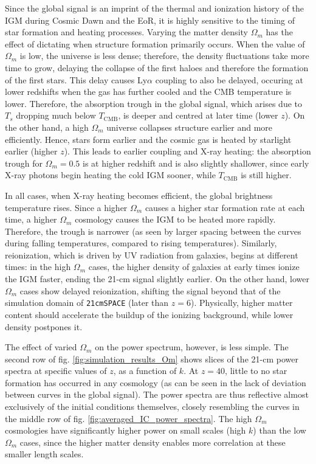 \documentclass[floats,floatfix,showpacs,amssymb,prd,superscriptaddress,nofootinbib]{revtex4-2} %
\newcommand{\code}{\texttt}
\begin{document}
Since the global signal is an imprint of the thermal and ionization history of the IGM during Cosmic Dawn and the EoR, it is highly sensitive to the timing of star formation and heating processes. Varying the matter density $\Omega_m$ has the effect of dictating when structure formation primarily occurs. When the value of $\Omega_m$ is low, the universe is less dense; therefore, the density fluctuations take more time to grow, delaying the collapse of the first haloes and therefore the formation of the first stars. This delay causes Ly$\alpha$ coupling to also be delayed, occuring at lower redshifts when the gas has further cooled and the CMB temperature is lower. Therefore, the absorption trough in the global signal, which arises due to $T_s$ dropping much below $T_\text{CMB}$, is deeper and centred at later time (lower $z$). On the other hand, a high $\Omega_m$ universe collapses structure earlier and more efficiently. Hence, stars form earlier and the cosmic gas is heated by starlight earlier (higher $z$). This leads to earlier coupling and X-ray heating: the absorption trough for $\Omega_m = 0.5$ is at higher redshift and is also slightly shallower, since early X-ray photons begin heating the cold IGM sooner, while $T_\text{CMB}$ is still higher. 

In all cases, when X-ray heating becomes efficient, the global brightness temperature rises. Since a higher $\Omega_m$ causes a higher star formation rate at each time, a higher $\Omega_m$ cosmology causes the IGM to be heated more rapidly. Therefore, the trough is narrower (as seen by larger spacing between the curves during falling temperatures, compared to rising temperatures). Similarly, reionization, which is driven by UV radiation from galaxies, begins at different times: in the high $\Omega_m$ cases, the higher density of galaxies at early times ionize the IGM faster, ending the 21-cm signal slightly earlier. On the other hand, lower $\Omega_m$ cases show delayed reionization, shifting the signal beyond that of the simulation domain of \code{21cmSPACE} (later than $z = 6$). Physically, higher matter content should accelerate the buildup of the ionizing background, while lower density postpones it.

The effect of varied $\Omega_m$ on the power spectrum, however, is less simple. The second row of fig. \ref{fig:simulation_results_Om} shows slices of the 21-cm power spectra at specific values of $z$, as a function of $k$. At $z = 40$, little to no star formation has occurred in any cosmology (as can be seen in the lack of deviation between curves in the global signal). The power spectra are thus reflective almost exclusively of the initial conditions themselves, closely resembling the curves in the middle row of fig. \ref{fig:averaged_IC_power_spectra}.
The high $\Omega_m$ cosmologies have significantly higher power on small scales (high $k$) than the low $\Omega_m$ cases, since the higher matter density enables more correlation at these smaller length scales. 
\end{document}

